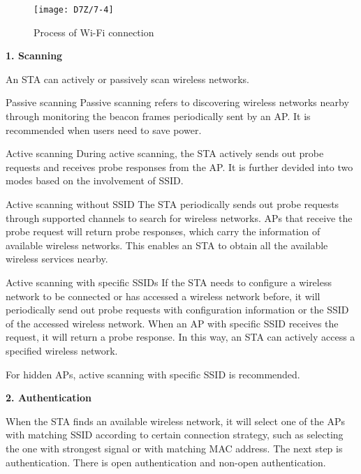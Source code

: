 \documentclass[a4paper,12pt]{book}
\begin{document}
\begin{figure}[!h]
    \centering
    \texttt{[image: D7Z/7-4]}
    \caption{Process of Wi-Fi connection}
\end{figure}

\textbf{1. Scanning}

An STA can actively or passively scan wireless networks.

\begin{term}{Passive scanning}
    Passive scanning refers to discovering wireless networks nearby through monitoring the beacon frames periodically sent by an AP. It is recommended when users need to save power.
\end{term}

\begin{term}{Active scanning}
    During active scanning, the STA actively sends out probe requests and receives probe responses from the AP. It is further devided into two modes based on the involvement of SSID.

    \parskip 6pt
    \begin{secterm}{Active scanning without SSID}
        The STA periodically sends out probe requests through supported channels to search for wireless networks. APs that receive the probe request will return probe responses, which carry the information of available wireless networks. This enables an STA to obtain all the available wireless services nearby.
    \end{secterm}

    \begin{secterm}{Active scanning with specific SSIDs}
        If the STA needs to configure a wireless network to be connected or has accessed a wireless network before, it will periodically send out probe requests with configuration information or the SSID of the accessed wireless network. When an AP with specific SSID receives the request, it will return a probe response. In this way, an STA can actively access a specified wireless network.
    \end{secterm}

    For hidden APs, active scanning with specific SSID is recommended.
\end{term}

\textbf{2. Authentication}

When the STA finds an available wireless network, it will select one of the APs with matching SSID according to certain connection strategy, such as selecting the one with strongest signal or with matching MAC address. The next step is authentication. There is open authentication and non-open authentication.
\end{document}
